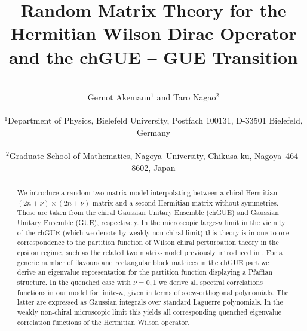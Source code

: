 \documentclass[11pt]{article}
\begin{document}
\topmargin -1.4cm
\oddsidemargin -0.8cm
\evensidemargin -0.8cm
\title{\Large{{\bf
Random Matrix Theory for the Hermitian Wilson Dirac Operator\\
and the chGUE -- GUE Transition
}}}

\vspace{1.5cm}

\author{~\\{\sc Gernot Akemann}$^{1}$ and {\sc Taro Nagao}$^{2}$
\\~\\
$^1$Department of Physics,
Bielefeld University,
Postfach 100131,
D-33501 Bielefeld, Germany\\~\\
$^2$Graduate School of Mathematics, Nagoya~University,
Chikusa-ku, Nagoya~464-8602, Japan
}
\date{}
\maketitle
\vfill
\begin{abstract}
We introduce a random two-matrix model interpolating between a chiral Hermitian
$(2n+\nu)\times (2n+\nu)$ matrix and a second Hermitian matrix without
symmetries. These are taken from the 
chiral Gaussian Unitary Ensemble (chGUE) and Gaussian Unitary
Ensemble (GUE), respectively. In the microscopic large-$n$ limit in
the vicinity of the chGUE (which we denote by weakly non-chiral limit) this
theory is in one to one correspondence to the partition function of
Wilson chiral perturbation theory in the epsilon regime, such as the
related two matrix-model previously introduced in \cite{DSV,ADSV}. 
For a generic number of flavours and rectangular block matrices in the
chGUE part we 
derive an eigenvalue representation for the partition function
displaying a Pfaffian 
structure.
In the quenched case with $\nu=0,1$ 
we derive all spectral correlations functions in our model for
finite-$n$, given in terms of skew-orthogonal polynomials. The latter
are expressed as Gaussian integrals over standard Laguerre
polynomials. 
In the weakly non-chiral microscopic limit this yields all
corresponding quenched eigenvalue correlation functions of the
Hermitian Wilson operator. 


\end{abstract}
\vfill




\thispagestyle{empty}
\newpage
\end{document}
